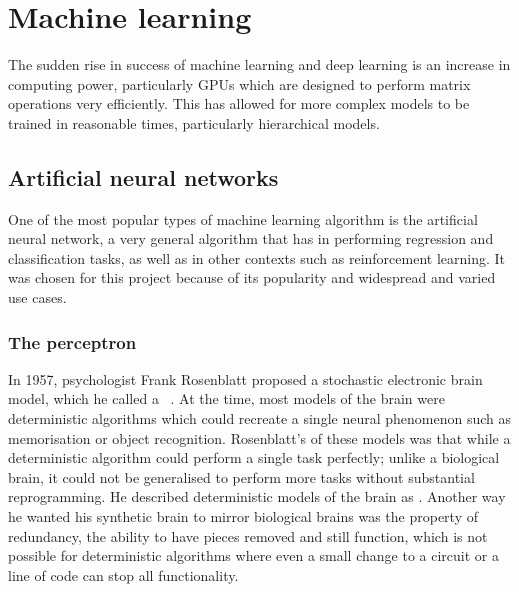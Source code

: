 
\chapter{Machine learning}

The sudden rise in success of machine learning and deep learning is  an increase in computing power, particularly \acp{GPU} which are designed to perform matrix operations very efficiently.
This has allowed for more complex models to be trained in reasonable times, particularly hierarchical models.

\section{Artificial neural networks}

One of the most popular types of machine learning algorithm is the artificial neural network, a very general algorithm that has  in performing regression and classification tasks, as well as in other contexts such as reinforcement learning.
It was chosen for this project because of its popularity and widespread and varied use cases.

\subsection{The perceptron}

In 1957, psychologist Frank Rosenblatt proposed a stochastic electronic brain model, which he called a ~\autocite{rosenblatt1957}.
At the time, most models of the brain were deterministic algorithms which could recreate a single neural phenomenon such as memorisation or object recognition.
Rosenblatt's  of these models was that while a deterministic algorithm could perform a single task perfectly; unlike a biological brain, it could not be generalised to perform more tasks without substantial reprogramming.
He described deterministic models of the brain as .
Another way he wanted his synthetic brain to mirror biological brains was the property of redundancy, the ability to have pieces removed and still function, which is not possible for deterministic algorithms where even a small change to a circuit or a line of code can stop all functionality.

